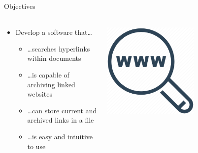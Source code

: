 \documentclass[
    ngerman,%
    authorontitle=true,
]{bfhbeamer}
\begin{document}
    \begin{frame}{Objectives}
        \framesubtitle{}
        \begin{columns} %
            \begin{column}{0.5\textwidth} %
                \begin{itemize}
                    \item Develop a software that\ldots
                    \begin{itemize}
                        \item \ldots searches hyperlinks within documents
                        \item \ldots is capable of archiving linked websites
                        \item \ldots can store current and archived links in a file
                        \item \ldots is easy and intuitive to use
                    \end{itemize}
                \end{itemize}
            \end{column}
            \begin{column}{0.3\textwidth} %
                \begin{center}
                    \includegraphics[width=0.6\textwidth]{pictures/lupe}
                \end{center}
            \end{column}
        \end{columns}
    \end{frame}
\end{document}
